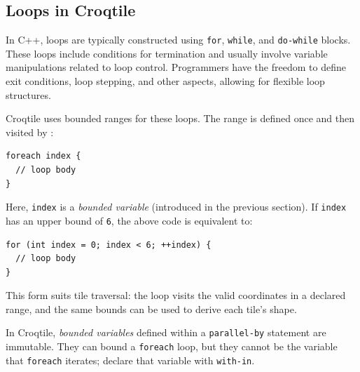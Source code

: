\subsection*{Loops in Croqtile}

In C++, loops are typically constructed using \texttt{for}, \texttt{while}, and \texttt{do-while} blocks. These loops include conditions for termination and usually involve variable manipulations related to loop control. Programmers have the freedom to define exit conditions, loop stepping, and other aspects, allowing for flexible loop structures.

Croqtile uses bounded ranges for these loops. The range is defined once and then visited by \co@foreach@:

\begin{lstlisting}[language=croqtile,caption={A foreach loop}]
foreach index {
  // loop body
}
\end{lstlisting}

Here, \texttt{index} is a \emph{bounded variable} (introduced in the previous section). If \texttt{index} has an upper bound of \texttt{6}, the above code is equivalent to:

\begin{lstlisting}[language={},caption={The equivalent C++ loop}]
for (int index = 0; index < 6; ++index) {
  // loop body
}
\end{lstlisting}

This form suits tile traversal: the loop visits the valid coordinates in a declared range, and the same bounds can be used to derive each tile's shape.

In Croqtile, \emph{bounded variables} defined within a \texttt{parallel-by} statement are immutable. They can bound a \texttt{foreach} loop, but they cannot be the variable that \texttt{foreach} iterates; declare that variable with \texttt{with-in}.
